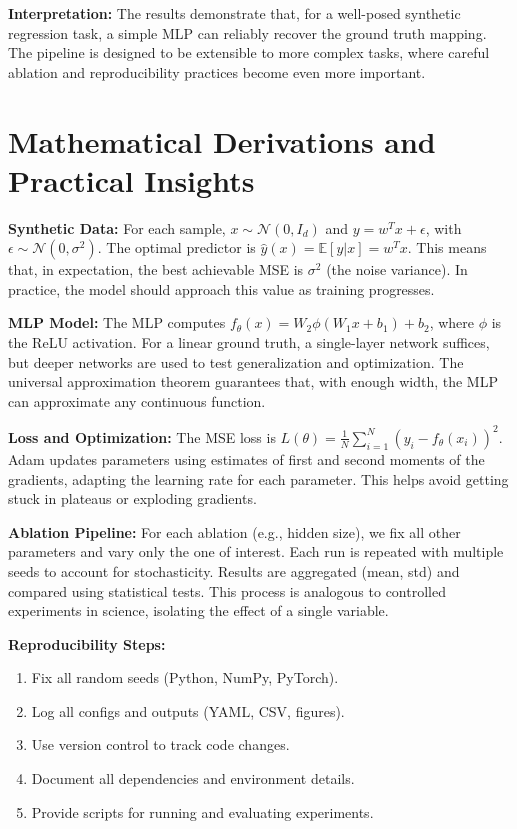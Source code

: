 \documentclass[11pt]{article}
\begin{document}
\textbf{Interpretation:} The results demonstrate that, for a well-posed synthetic regression task, a simple MLP can reliably recover the ground truth mapping. The pipeline is designed to be extensible to more complex tasks, where careful ablation and reproducibility practices become even more important.


\section*{Mathematical Derivations and Practical Insights}
\textbf{Synthetic Data:} For each sample, $x \sim \mathcal{N}(0, I_d)$ and $y = w^T x + \epsilon$, with $\epsilon \sim \mathcal{N}(0, \sigma^2)$. The optimal predictor is $\hat{y}(x) = \mathbb{E}[y|x] = w^T x$. This means that, in expectation, the best achievable MSE is $\sigma^2$ (the noise variance). In practice, the model should approach this value as training progresses.

\textbf{MLP Model:} The MLP computes $f_\theta(x) = W_2 \phi(W_1 x + b_1) + b_2$, where $\phi$ is the ReLU activation. For a linear ground truth, a single-layer network suffices, but deeper networks are used to test generalization and optimization. The universal approximation theorem guarantees that, with enough width, the MLP can approximate any continuous function.

\textbf{Loss and Optimization:} The MSE loss is $L(\theta) = \frac{1}{N} \sum_{i=1}^N (y_i - f_\theta(x_i))^2$. Adam updates parameters using estimates of first and second moments of the gradients, adapting the learning rate for each parameter. This helps avoid getting stuck in plateaus or exploding gradients.

\textbf{Ablation Pipeline:} For each ablation (e.g., hidden size), we fix all other parameters and vary only the one of interest. Each run is repeated with multiple seeds to account for stochasticity. Results are aggregated (mean, std) and compared using statistical tests. This process is analogous to controlled experiments in science, isolating the effect of a single variable.

\textbf{Reproducibility Steps:}
\begin{enumerate}
  \item Fix all random seeds (Python, NumPy, PyTorch).
  \item Log all configs and outputs (YAML, CSV, figures).
  \item Use version control to track code changes.
  \item Document all dependencies and environment details.
  \item Provide scripts for running and evaluating experiments.
\end{enumerate}
\end{document}
